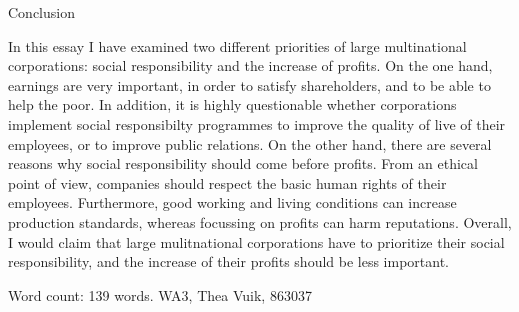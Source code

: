 \documentclass[a4paper,11pt]{article}
\begin{document}
\begin{center}
Conclusion
\end{center}

In this essay I have examined two different priorities of large multinational corporations: social responsibility and the increase of profits. %
On the one hand, earnings are very important, in order to satisfy shareholders, and to be able to help the poor. %
In addition, it is highly questionable whether corporations implement social responsibilty programmes to improve the quality of live of their employees, or to improve public relations. %
On the other hand, there are several reasons why social responsibility should come before profits. %
From an ethical point of view, companies should respect the basic human rights of their employees. %
Furthermore, good working and living conditions can increase production standards, whereas focussing on profits can harm reputations. %
Overall, I would claim that large mulitnational corporations have to prioritize their social responsibility, and the increase of their profits should be less important. %

Word count: 139 words. WA3, Thea Vuik, 863037
\end{document}

